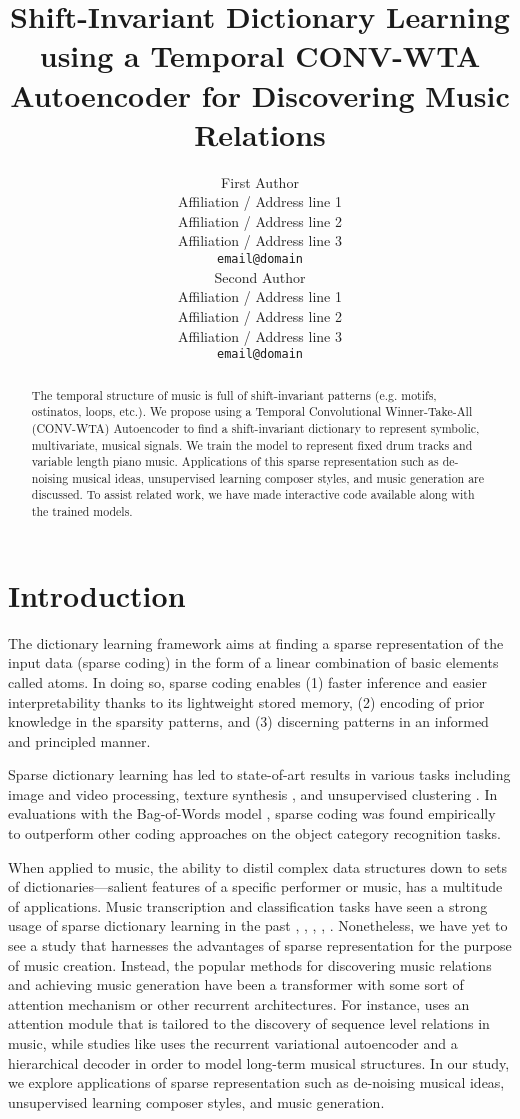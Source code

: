 \documentclass[11pt,a4paper]{article}
\title{Shift-Invariant Dictionary Learning using a Temporal CONV-WTA Autoencoder for Discovering Music Relations }
\author{First Author \\
  Affiliation / Address line 1 \\
  Affiliation / Address line 2 \\
  Affiliation / Address line 3 \\
  \texttt{email@domain} \\\And
  Second Author \\
  Affiliation / Address line 1 \\
  Affiliation / Address line 2 \\
  Affiliation / Address line 3 \\
  \texttt{email@domain} \\}
\date{}
\begin{document}
\maketitle
\begin{abstract}
The temporal structure  of music is full of shift-invariant patterns (e.g. motifs, ostinatos, loops, etc.). We propose using a Temporal Convolutional Winner-Take-All (CONV-WTA) Autoencoder to find a shift-invariant dictionary to represent symbolic, multivariate, musical signals. We train the model to represent fixed drum tracks and variable length piano music. Applications of this sparse representation such as de-noising musical ideas, unsupervised learning composer styles, and music generation are discussed. To assist related work, we have made interactive code available along with the trained models. 

\end{abstract}

\section{Introduction}

The dictionary learning framework aims at finding a sparse representation of the input data (sparse coding) in the form of a linear combination of basic elements called atoms. In doing so, sparse coding enables (1) faster inference and easier interpretability thanks to its lightweight stored memory, (2) encoding of prior knowledge in the sparsity patterns, and (3) discerning patterns in an informed and principled manner.  

 Sparse dictionary learning has led to state-of-art results in various tasks including image and video processing, texture synthesis \cite{Peyre2009}, and unsupervised clustering \cite{Ramrez2010ClassificationAC}. In evaluations with the Bag-of-Words model \cite{7439823}, sparse coding was found empirically to outperform other coding approaches on the object category recognition tasks.  

When applied to music, the ability to distil complex data structures down to sets of dictionaries—salient features of a specific performer or music, has a multitude of applications. Music transcription and classification tasks have seen a strong usage of sparse dictionary learning in the past \cite{Grosse2007} \cite{Costantini2013}, \cite{Blumensath2006}, \cite{SrinivasM2014}, \cite{Srinivas2014}, \cite{Cogliati2016}. Nonetheless, we have yet to see a study that harnesses the advantages of sparse representation for the purpose of music creation. Instead, the popular methods for discovering music relations and achieving music generation have been a transformer with some sort of attention mechanism or other recurrent architectures. For instance, \cite{JiangJunyan2020} uses an attention module that is tailored to the discovery of sequence level relations in music, while studies like \cite{Roberts2018} uses the recurrent variational autoencoder and a hierarchical decoder in order to model long-term musical structures. In our study, we explore applications of sparse representation such as de-noising musical ideas, unsupervised learning composer styles, and music generation.
\end{document}
